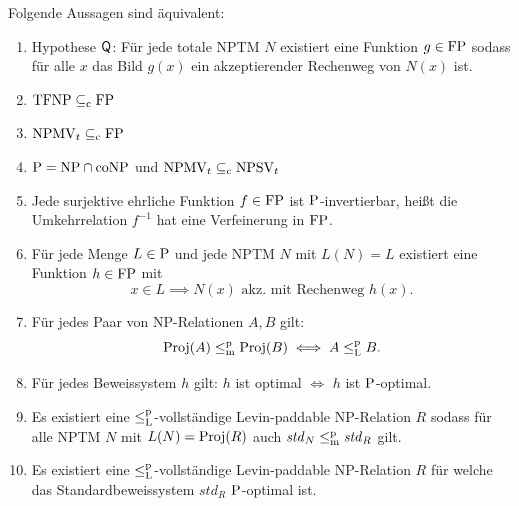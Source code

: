 \begin{theorem}\label{thm:q}
    Folgende Aussagen sind äquivalent:
    \begin{enumerate}[midpenalty=0]
        \item Hypothese $\hQ$: Für jede totale NPTM $N$  existiert eine Funktion $g\in\FP$ sodass für alle $x$ das Bild $g(x)$ ein akzeptierender Rechenweg von $N(x)$ ist.
        \item $\TFNP\subseteqc \FP$
        \item $\mathrm{NPMV}_t\subseteqc \FP$
        \item $\P=\NP\cap\coNP$ und $\mathrm{NPMV}_t\subseteqc \mathrm{NPSV}_t$
        \item Jede surjektive ehrliche Funktion $f\in\FP$ ist $\P$-invertierbar, heißt die Umkehrrelation $f^{-1}$ hat eine Verfeinerung in $\FP$. 
        \item Für jede Menge $L\in \P$  und jede NPTM $N$ mit $L(N)=L$ existiert eine Funktion $h\in \FP$ mit 
            \[ x\in L \implies N(x) \text{ akz. mit Rechenweg $h(x)$}. \]
        \item Für jedes Paar von NP-Relationen $A, B$ gilt:
            \[ \Proj(A) \leqmp \Proj(B) \iff A \leqlp B. \]
        \item Für jedes Beweissystem $h$ gilt: $h$ ist optimal $\iff$ $h$ ist $\P$-optimal. 
        \item Es existiert eine $\leqlp$-vollständige Levin-paddable NP-Relation $R$ sodass für alle NPTM $N$ mit $L(N)=\Proj(R)$ auch $\mathit{std}_N\leqmp \mathit{std}_R$ gilt.
        \item Es existiert eine $\leqlp$-vollständige Levin-paddable NP-Relation $R$ für welche das Standardbeweissystem $\mathit{std}_R$ $\P$-optimal ist.
    \end{enumerate}
\end{theorem}

